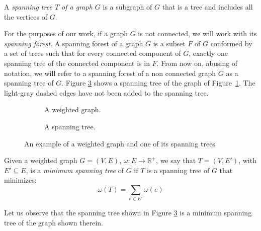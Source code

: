 \begin{definition} \label{def:st}
A \textit{spanning tree $T$ of a graph $G$} is a subgraph of $G$ that is a tree and includes all the vertices of $G$. 
\end{definition}

For the purposes of our work, if a graph $G$ is not connected, we will work with its \textit{spanning forest}. 
A spanning forest of a graph $G$ is a subset $F$ of $G$ conformed by a set of trees such that for every connected component 
of $G$, exactly one spanning tree of the connected component is in $F$.
From now on,  abusing of notation, we will refer to a spanning forest of a non connected graph $G$ as a spanning tree of $G$. 
Figure \ref{fig:example_spanning} shows a spanning tree of the graph of Figure~\ref{fig:example_graph}. 
The light-gray dashed edges have not been added to the spanning tree.

\begin{figure}
    \centering
    \begin{subfigure}{0.48\textwidth}
        
        \caption{A weighted graph.}
        \label{fig:example_graph}
    \end{subfigure}
    \begin{subfigure}{0.48\textwidth}
        
        \caption{A spanning tree.}
        \label{fig:example_spanning}
    \end{subfigure}
    \caption{An example of a weighted graph and one of its spanning trees}
\end{figure}


\begin{definition}\cite{AlgorithmicsNotes} 
\label{def:mst}
Given a weighted graph $G=(V,E)$, $\omega: E\rightarrow \mathbb{R}^+$, we say that $T=(V,E')$, with $E' \subseteq E$, is a \textit{minimum spanning tree} of $G$ if $T$ is a spanning tree of $G$ that minimizes:
\[
\omega(T) = \sum_{e \in E'} \omega(e)
\]
\end{definition}
Let us observe that the spanning tree shown in Figure \ref{fig:example_spanning} is a minimum spanning tree of the graph shown therein.

